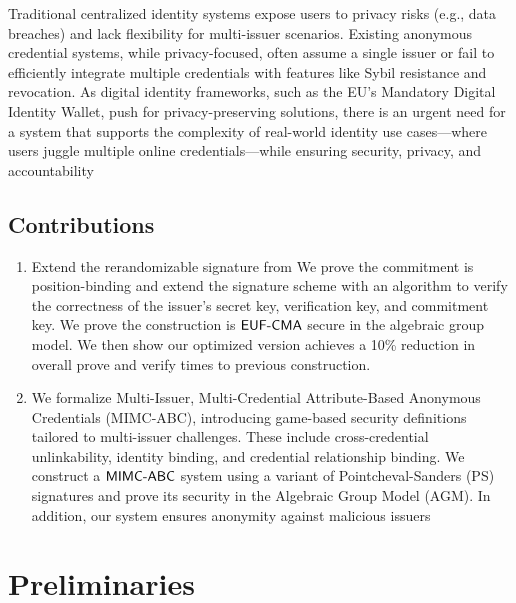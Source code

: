 Traditional centralized identity systems expose users to privacy risks (e.g., data breaches) and lack flexibility for multi-issuer scenarios. Existing anonymous credential systems, while privacy-focused, often assume a single issuer or fail to efficiently integrate multiple credentials with features like Sybil resistance and revocation. As digital identity frameworks, such as the EU’s Mandatory Digital Identity Wallet, push for privacy-preserving solutions, there is an urgent need for a system that supports the complexity of real-world identity use cases—where users juggle multiple online credentials—while ensuring security, privacy, and accountability


\subsection{Contributions}

\begin{enumerate}
    \item Extend the rerandomizable signature from \cite{tomescu2022utt} 
    We prove the commitment is position-binding and extend the signature scheme with an algorithm to verify the correctness of the issuer's secret key, verification key, and commitment key. We prove the construction is $\mathsf{EUF\text{-}CMA}$ secure in the algebraic group model. We then show our optimized version achieves a 10\% reduction in overall prove and verify times to previous construction. 
    
    \item We formalize Multi-Issuer, Multi-Credential Attribute-Based Anonymous Credentials (MIMC-ABC), introducing game-based security definitions tailored to multi-issuer challenges. These include cross-credential unlinkability, identity binding, and credential relationship binding. We construct a $\mathsf{MIMC\text{-}ABC}$ system using a variant of Pointcheval-Sanders (PS) signatures and prove its security in the Algebraic Group Model (AGM). In addition, our system ensures anonymity against malicious issuers

\end{enumerate}





\section{Preliminaries}


